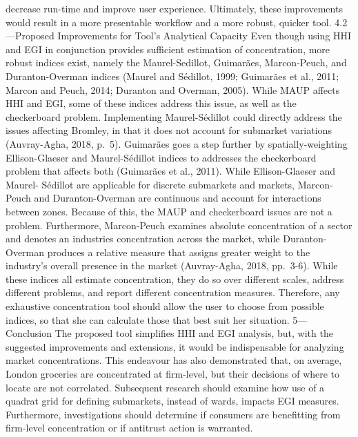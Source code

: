 \documentclass[]{article}
\begin{document}
decrease run-time and improve user experience. Ultimately, these
improvements would result in a more presentable workflow and a more
robust, quicker tool. 4.2---Proposed Improvements for Tool's Analytical
Capacity Even though using HHI and EGI in conjunction provides
sufficient estimation of concentration, more robust indices exist,
namely the Maurel-Sedillot, Guimarães, Marcon-Peuch, and
Duranton-Overman indices (Maurel and Sédillot, 1999; Guimarães et al.,
2011; Marcon and Peuch, 2014; Duranton and Overman, 2005). While MAUP
affects HHI and EGI, some of these indices address this issue, as well
as the checkerboard problem. Implementing Maurel-Sédillot could directly
address the issues affecting Bromley, in that it does not account for
submarket variations (Auvray-Agha, 2018, p.~5). Guimarães goes a step
further by spatially-weighting Ellison-Glaeser and Maurel-Sédillot
indices to addresses the checkerboard problem that affects both
(Guimarães et al., 2011). While Ellison-Glaeser and Maurel- Sédillot are
applicable for discrete submarkets and markets, Marcon-Peuch and
Duranton-Overman are continuous and account for interactions between
zones. Because of this, the MAUP and checkerboard issues are not a
problem. Furthermore, Marcon-Peuch examines absolute concentration of a
sector and denotes an industries concentration across the market, while
Duranton-Overman produces a relative measure that assigns greater weight
to the industry's overall presence in the market (Auvray-Agha, 2018,
pp.~3-6). While these indices all estimate concentration, they do so
over different scales, address different problems, and report different
concentration measures. Therefore, any exhaustive concentration tool
should allow the user to choose from possible indices, so that she can
calculate those that best suit her situation. 5---Conclusion The
proposed tool simplifies HHI and EGI analysis, but, with the suggested
improvements and extensions, it would be indispensable for analyzing
market concentrations. This endeavour has also demonstrated that, on
average, London groceries are concentrated at firm-level, but their
decisions of where to locate are not correlated. Subsequent research
should examine how use of a quadrat grid for defining submarkets,
instead of wards, impacts EGI measures. Furthermore, investigations
should determine if consumers are benefitting from firm-level
concentration or if antitrust action is warranted.
\end{document}

